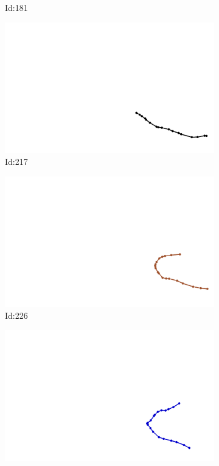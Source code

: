 \documentclass[12pt,twoside]{report}
\begin{document}
\begin{figure}
\begin{subfigure}[b]{0.20\textwidth}
\caption{Id:181}
\end{subfigure}
\begin{subfigure}[b]{0.20\textwidth}
\centering
\includegraphics[width=\textwidth]{../trajectories/217.png}
\caption{Id:217}
\end{subfigure}
\begin{subfigure}[b]{0.20\textwidth}
\centering
\includegraphics[width=\textwidth]{../trajectories/226.png}
\caption{Id:226}
\end{subfigure}
\begin{subfigure}[b]{0.20\textwidth}
\centering
\includegraphics[width=\textwidth]{../trajectories/228.png}

\end{subfigure}
\end{figure}
\end{document}
